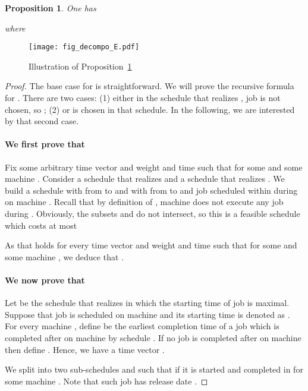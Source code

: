 \documentclass[11pt,a4paper]{article}
\newtheorem{prop}{Proposition}
\begin{document}
\begin{prop}\label{prop_E}
One has

where

\end{prop}

\begin{figure}[ht]
\begin{center}
\texttt{[image: fig\_decompo\_E.pdf]}
\end{center}
\caption{Illustration of Proposition~\ref{prop_E}}
\label{fig_E}
\end{figure}


\begin{proof}
The base case for  is straightforward. We will prove the recursive formula 
for . There are two cases: (1) either in the schedule
that realizes , job  is not chosen, so 
; 
(2) or  is chosen in that schedule. In the following, we are interested 
by that second case.

\paragraph{We first prove that }
Fix some arbitrary time vector 
and weight  and time  such that 
for some  and some machine . 
Consider a schedule  
that realizes  and  
a schedule that realizes .
We build a schedule with  from  to  and with 
 from  to  and job  scheduled within 
during  on machine . 
Recall that by definition of , 
machine  does not execute any job during .
Obviously, the subsets  and  do not intersect, so
this is a feasible schedule which costs at most 

As that holds for every time vector 
and weight  and time  such that 
for some  and some machine , we deduce that 
.



\paragraph{We now prove that }
Let  be the schedule that realizes  in which
the starting time of job  is maximal. Suppose that job  is scheduled on machine  and 
its starting time is denoted as . For every machine , define  be the earliest 
completion time of a job which is completed after  on machine  by schedule . 
If no job is completed after  on machine  then define . Hence, we have a time vector 
.

We split  into two sub-schedules  
and 
such that  if it is started and completed in  for 
some machine . Note that such job  has release date .


\end{proof}
\end{document}
